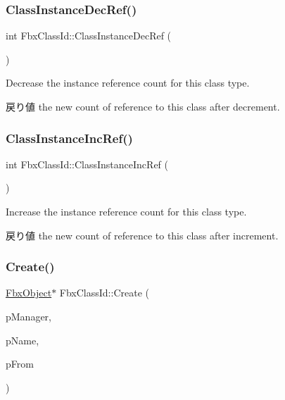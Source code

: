 \subsubsection{\texorpdfstring{Class\+Instance\+Dec\+Ref()}{ClassInstanceDecRef()}}
{\footnotesize\ttfamily int Fbx\+Class\+Id\+::\+Class\+Instance\+Dec\+Ref (\begin{DoxyParamCaption}{ }\end{DoxyParamCaption})}

Decrease the instance reference count for this class type. \begin{DoxyReturn}{戻り値}
the new count of reference to this class after decrement. 
\end{DoxyReturn}
\mbox{\label{class_fbx_class_id_a7133ed002b3dc51f227f05f178f4d9c9}} 
\subsubsection{\texorpdfstring{Class\+Instance\+Inc\+Ref()}{ClassInstanceIncRef()}}
{\footnotesize\ttfamily int Fbx\+Class\+Id\+::\+Class\+Instance\+Inc\+Ref (\begin{DoxyParamCaption}{ }\end{DoxyParamCaption})}

Increase the instance reference count for this class type. \begin{DoxyReturn}{戻り値}
the new count of reference to this class after increment. 
\end{DoxyReturn}
\mbox{\label{class_fbx_class_id_a25765b5f1823d8416918bac07b9b493c}} 
\subsubsection{\texorpdfstring{Create()}{Create()}}
{\footnotesize\ttfamily \hyperlink{class_fbx_object}{Fbx\+Object}$\ast$ Fbx\+Class\+Id\+::\+Create (\begin{DoxyParamCaption}\item[{\hyperlink{class_fbx_manager}{Fbx\+Manager} \&}]{p\+Manager,  }\item[{const char $\ast$}]{p\+Name,  }\item[{const \hyperlink{class_fbx_object}{Fbx\+Object} $\ast$}]{p\+From }\end{DoxyParamCaption})}

